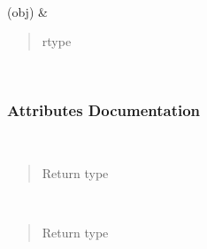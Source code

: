 \documentclass[letterpaper,10pt,english]{sphinxmanual}
\begin{document}
\begin{fulllineitems}
\begin{savenotes}
\begin{longtable}[c]{}
\\
\hline
\sphinxAtStartPar
{\hyperref[\detokenize{api/seyfert.cosmology.c_ells.H5Cl:seyfert.cosmology.c_ells.H5Cl.writeToObject}]{}}(obj)
&
\sphinxAtStartPar
\begin{quote}\begin{description}
\item[{rtype}] \leavevmode
\sphinxAtStartPar
{}

\end{description}\end{quote}

\\
\hline
\end{longtable}\sphinxatlongtableend\end{savenotes}
\subsubsection*{Attributes Documentation}

\begin{fulllineitems}
\label{\detokenize{api/seyfert.cosmology.c_ells.H5Cl:seyfert.cosmology.c_ells.H5Cl.absolute_main_path}}~\begin{quote}\begin{description}
\item[{Return type}] \leavevmode
\sphinxAtStartPar
{}

\end{description}\end{quote}

\end{fulllineitems}


\begin{fulllineitems}
\label{\detokenize{api/seyfert.cosmology.c_ells.H5Cl:seyfert.cosmology.c_ells.H5Cl.main_path_rel_to_root}}~\begin{quote}\begin{description}
\item[{Return type}] \leavevmode
\sphinxAtStartPar
{}


\end{description}
\end{quote}
\end{fulllineitems}
\end{fulllineitems}
\end{document}
